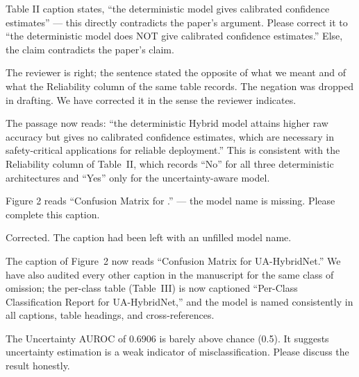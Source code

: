 \begin{reviewercomment}
Table II caption states, ``the deterministic model gives calibrated
confidence estimates'' --- this directly contradicts the paper's
argument. Please correct it to ``the deterministic model does NOT give
calibrated confidence estimates.'' Else, the claim contradicts the
paper's claim.
\end{reviewercomment}

\response The reviewer is right; the sentence stated the opposite of what
we meant and of what the Reliability column of the same table records.
The negation was dropped in drafting. We have corrected it in the sense
the reviewer indicates.

\begin{changesblock}
The passage now reads: ``the deterministic Hybrid model attains
higher raw accuracy but gives no calibrated confidence estimates, which
are necessary in safety-critical applications for reliable deployment.''
This is consistent with the Reliability column of Table~II, which records
``No'' for all three deterministic architectures and ``Yes'' only for the
uncertainty-aware model.
\end{changesblock}


\begin{reviewercomment}
Figure 2 reads ``Confusion Matrix for .'' --- the model name is missing.
Please complete this caption.
\end{reviewercomment}

\response Corrected. The caption had been left with an unfilled model
name.

\begin{changesblock}
The caption of Figure~2 now reads ``Confusion Matrix for
UA-HybridNet.'' We have also audited every other caption in the
manuscript for the same class of omission; the per-class table
(Table~III) is now captioned ``Per-Class Classification Report for
UA-HybridNet,'' and the model is named consistently in all captions,
table headings, and cross-references.
\end{changesblock}


\begin{reviewercomment}
The Uncertainty AUROC of 0.6906 is barely above chance (0.5). It suggests
uncertainty estimation is a weak indicator of misclassification. Please
discuss the result honestly.
\end{reviewercomment}

